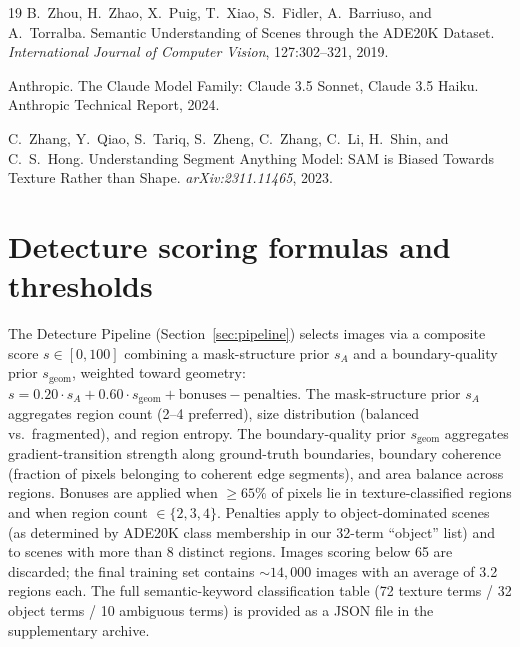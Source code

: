 \documentclass{article}
\begin{document}
\begin{thebibliography}{19}
B.~Zhou, H.~Zhao, X.~Puig, T.~Xiao, S.~Fidler, A.~Barriuso, and A.~Torralba.
\newblock Semantic Understanding of Scenes through the {ADE20K} Dataset.
\newblock \emph{International Journal of Computer Vision}, 127:302--321, 2019.

Anthropic.
\newblock The Claude Model Family: Claude 3.5 Sonnet, Claude 3.5 Haiku.
\newblock Anthropic Technical Report, 2024.

C.~Zhang, Y.~Qiao, S.~Tariq, S.~Zheng, C.~Zhang, C.~Li, H.~Shin, and C.~S.~Hong.
\newblock Understanding Segment Anything Model: {SAM} is Biased Towards Texture Rather than Shape.
\newblock \emph{arXiv:2311.11465}, 2023.

\end{thebibliography}


\appendix

\section{Detecture scoring formulas and thresholds}
\label{app:scoring}
The Detecture Pipeline (Section~\ref{sec:pipeline}) selects images via a composite score $s \in [0, 100]$ combining a mask-structure prior $s_A$ and a boundary-quality prior $s_{\text{geom}}$, weighted toward geometry: $s = 0.20 \cdot s_A + 0.60 \cdot s_{\text{geom}} + \text{bonuses} - \text{penalties}$. The mask-structure prior $s_A$ aggregates region count (2--4 preferred), size distribution (balanced vs.\ fragmented), and region entropy. The boundary-quality prior $s_{\text{geom}}$ aggregates gradient-transition strength along ground-truth boundaries, boundary coherence (fraction of pixels belonging to coherent edge segments), and area balance across regions. Bonuses are applied when ${\geq}65\%$ of pixels lie in texture-classified regions and when region count $\in \{2, 3, 4\}$. Penalties apply to object-dominated scenes (as determined by ADE20K class membership in our 32-term ``object'' list) and to scenes with more than 8 distinct regions. Images scoring below 65 are discarded; the final training set contains ${\sim}14{,}000$ images with an average of 3.2 regions each. The full semantic-keyword classification table (72 texture terms / 32 object terms / 10 ambiguous terms) is provided as a JSON file in the supplementary archive.
\end{document}
